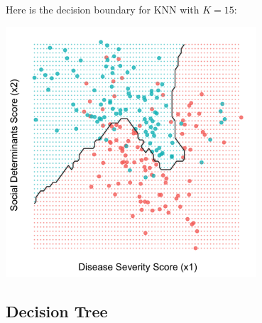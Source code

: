 \noindent Here is the decision boundary for KNN with $K=15$:
\begin{center}
\includegraphics[width=0.7\textwidth]{img/esl-knn-15.png}
\end{center}

\subsection{Decision Tree \label{ssect:class_decision_tree}}

